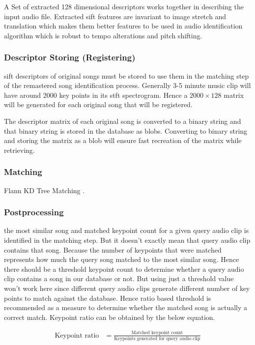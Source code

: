 A Set of extracted 128 dimensional descriptors works together in describing the input audio file. Extracted 
\ac{sift} features are invariant to image stretch and translation which makes them better features to be used
in audio identification algorithm which is robust to tempo alterations and pitch shifting. 

\subsubsection{Descriptor Storing (Registering)}
\ac{sift} descriptors of original songs must be stored to use them in the matching step of the remastered
song identification process. Generally 3-5 minute music clip will have around 2000 key points in its \ac{stft}
spectrogram. Hence a \(2000\times 128\) matrix will be generated for each original song that will be registered.

The descriptor matrix of each original song is converted to a binary string and that binary string is stored 
in the database as \ac{blob}s. Converting to binary string and storing the matrix as a \ac{blob} will ensure
fast recreation of the matrix while retrieving\cite{Sears2006}.   

\subsubsection{Matching}
Flann KD Tree Matching \cite{Muja}.

\subsubsection{Postprocessing}
the most similar song and matched keypoint count for a given query audio clip is identified in the matching step. But
it doesn't exactly mean that query audio clip contains that song. Because the number of keypoints that were matched
represents how much the query song matched to the most similar song. Hence there should be a threshold keypoint count
to determine whether a query audio clip contains a song in our database or not. But using just a threshold value 
won't work here since different query audio clips generate different number of key points to match against the
database. Hence ratio based threshold is recommended as a measure to determine whether the matched song is actually a
correct match. Keypoint ratio can be obtained by the below equation. 

\begin{align*}
\text{Keypoint ratio} &= \frac{\text{Matched keypoint count}}{\text{Keypoints generated for query audio clip}}\\
\end{align*}

